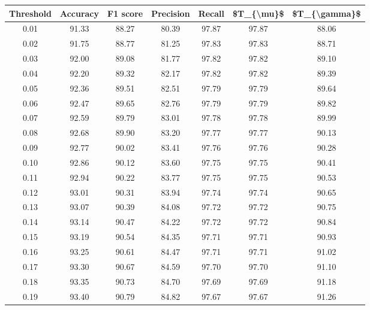 \begin{tabular}{|c|c|c|c|c|c|c|}
\hline
 Threshold &  Accuracy &  F1 score &  Precision &  Recall &  \$T\_\{\textbackslash mu\}\$ &  \$T\_\{\textbackslash gamma\}\$ \\
\hline
      0.01 &     91.33 &     88.27 &      80.39 &   97.87 &      97.87 &         88.06 \\
      0.02 &     91.75 &     88.77 &      81.25 &   97.83 &      97.83 &         88.71 \\
      0.03 &     92.00 &     89.08 &      81.77 &   97.82 &      97.82 &         89.10 \\
      0.04 &     92.20 &     89.32 &      82.17 &   97.82 &      97.82 &         89.39 \\
      0.05 &     92.36 &     89.51 &      82.51 &   97.79 &      97.79 &         89.64 \\
      0.06 &     92.47 &     89.65 &      82.76 &   97.79 &      97.79 &         89.82 \\
      0.07 &     92.59 &     89.79 &      83.01 &   97.78 &      97.78 &         89.99 \\
      0.08 &     92.68 &     89.90 &      83.20 &   97.77 &      97.77 &         90.13 \\
      0.09 &     92.77 &     90.02 &      83.41 &   97.76 &      97.76 &         90.28 \\
      0.10 &     92.86 &     90.12 &      83.60 &   97.75 &      97.75 &         90.41 \\
      0.11 &     92.94 &     90.22 &      83.77 &   97.75 &      97.75 &         90.53 \\
      0.12 &     93.01 &     90.31 &      83.94 &   97.74 &      97.74 &         90.65 \\
      0.13 &     93.07 &     90.39 &      84.08 &   97.72 &      97.72 &         90.75 \\
      0.14 &     93.14 &     90.47 &      84.22 &   97.72 &      97.72 &         90.84 \\
      0.15 &     93.19 &     90.54 &      84.35 &   97.71 &      97.71 &         90.93 \\
      0.16 &     93.25 &     90.61 &      84.47 &   97.71 &      97.71 &         91.02 \\
      0.17 &     93.30 &     90.67 &      84.59 &   97.70 &      97.70 &         91.10 \\
      0.18 &     93.35 &     90.73 &      84.70 &   97.69 &      97.69 &         91.18 \\
      0.19 &     93.40 &     90.79 &      84.82 &   97.67 &      97.67 &         91.26 \\

\end{tabular}

